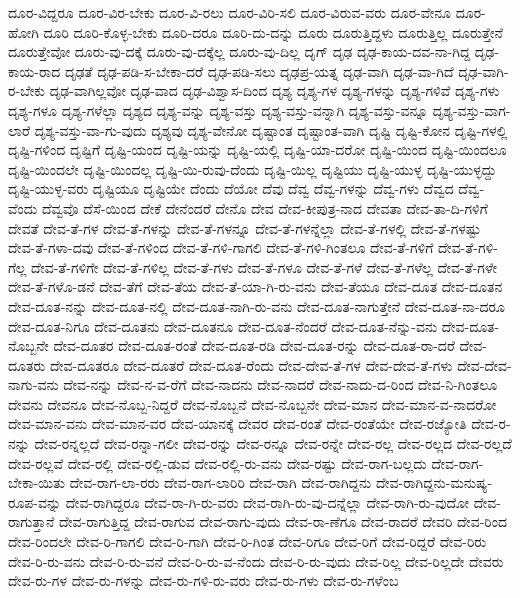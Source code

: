 {ದೂರ-ವಿದ್ದರೂ
ದೂರ-ವಿರ-ಬೇಕು
ದೂರ-ವಿ-ರಲು
ದೂರ-ವಿರಿ-ಸಲಿ
ದೂರ-ವಿರುವ-ವರು
ದೂರ-ವೇನೂ
ದೂರ-ಹೋಗಿ
ದೂರಿ
ದೂರಿ-ಕೊಳ್ಳ-ಬೇಕು
ದೂರಿ-ದರೂ
ದೂರಿ-ದು-ದನ್ನು
ದೂರು
ದೂರುತ್ತಿದ್ದಳು
ದೂರುತ್ತಿಲ್ಲ
ದೂರುತ್ತೇನೆ
ದೂರುತ್ತೇವೋ
ದೂರು-ವು-ದಕ್ಕೆ
ದೂರು-ವು-ದಕ್ಕೆಲ್ಲ
ದೂರು-ವು-ದಿಲ್ಲ
ದೃಗ್
ದೃಢ
ದೃಢ-ಕಾಯ-ದವ-ನಾ-ಗಿದ್ದ
ದೃಢ-ಕಾಯ-ರಾದ
ದೃಢತೆ
ದೃಢ-ಪಡಿ-ಸ-ಬೇಕಾ-ದರೆ
ದೃಢ-ಪಡಿ-ಸಲು
ದೃಢಪ್ರ-ಯತ್ನ
ದೃಢ-ವಾಗಿ
ದೃಢ-ವಾ-ಗಿದೆ
ದೃಢ-ವಾಗಿ-ರ-ಬೇಕು
ದೃಢ-ವಾಗಿಲ್ಲವೋ
ದೃಢ-ವಾದ
ದೃಢ-ವಿಶ್ವಾಸ-ದಿಂದ
ದೃಶ್ಯ
ದೃಶ್ಯ-ಗಳ
ದೃಶ್ಯ-ಗಳನ್ನು
ದೃಶ್ಯ-ಗಳಿವೆ
ದೃಶ್ಯ-ಗಳು
ದೃಶ್ಯ-ಗಳೂ
ದೃಶ್ಯ-ಗಳೆಲ್ಲಾ
ದೃಶ್ಯದ
ದೃಶ್ಯ-ವನ್ನು
ದೃಶ್ಯ-ವಸ್ತು
ದೃಶ್ಯ-ವಸ್ತು-ವನ್ನಾಗಿ
ದೃಶ್ಯ-ವಸ್ತು-ವನ್ನೂ
ದೃಶ್ಯ-ವಸ್ತು-ವಾಗ-ಲಾರೆ
ದೃಶ್ಯ-ವಸ್ತು-ವಾ-ಗು-ವುದು
ದೃಶ್ಯವು
ದೃಶ್ಯ-ವೇನೋ
ದೃಷ್ಟಾಂತ
ದೃಷ್ಟಾಂತ-ವಾಗಿ
ದೃಷ್ಟಿ
ದೃಷ್ಟಿ-ಕೋನ
ದೃಷ್ಟಿ-ಗಳಲ್ಲಿ
ದೃಷ್ಟಿ-ಗಳಿಂದ
ದೃಷ್ಟಿಗೆ
ದೃಷ್ಟಿ-ಯಂದ
ದೃಷ್ಟಿ-ಯನ್ನು
ದೃಷ್ಟಿ-ಯಲ್ಲಿ
ದೃಷ್ಟಿ-ಯಾ-ದರೋ
ದೃಷ್ಟಿ-ಯಿಂದ
ದೃಷ್ಟಿ-ಯಿಂದಲೂ
ದೃಷ್ಟಿ-ಯಿಂದಲೇ
ದೃಷ್ಟಿ-ಯಿಂದಲ್ಲ
ದೃಷ್ಟಿ-ಯಿ-ರುವು-ದೆಂದು
ದೃಷ್ಟಿ-ಯಿಲ್ಲ
ದೃಷ್ಟಿಯು
ದೃಷ್ಟಿ-ಯುಳ್ಳ
ದೃಷ್ಟಿ-ಯುಳ್ಳದ್ದು
ದೃಷ್ಟಿ-ಯುಳ್ಳ-ವರು
ದೃಷ್ಟಿಯೂ
ದೃಷ್ಟಿಯೇ
ದೆಂದು
ದೆಯೋ
ದೆವು
ದೆವ್ವ
ದೆವ್ವ-ಗಳನ್ನು
ದೆವ್ವ-ಗಳು
ದೆವ್ವದ
ದೆವ್ವ-ವೆಂದು
ದೆವ್ವವೊ
ದೆಸೆ-ಯಿಂದ
ದೇಕೆ
ದೇನೆಂದರೆ
ದೇನೊ
ದೇವ
ದೇವ-ಕೀಪುತ್ರ-ನಾದ
ದೇವತಾ
ದೇವ-ತಾ-ದಿ-ಗಳಿಗೆ
ದೇವತೆ
ದೇವ-ತೆ-ಗಳ
ದೇವ-ತೆ-ಗಳನ್ನು
ದೇವ-ತೆ-ಗಳನ್ನೂ
ದೇವ-ತೆ-ಗಳನ್ನೆಲ್ಲಾ
ದೇವ-ತೆ-ಗಳಲ್ಲಿ
ದೇವ-ತೆ-ಗಳಷ್ಟು
ದೇವ-ತೆ-ಗಳಾ-ದವು
ದೇವ-ತೆ-ಗಳಿಂದ
ದೇವ-ತೆ-ಗಳಿ-ಗಾಗಲಿ
ದೇವ-ತೆ-ಗಳಿ-ಗಿಂತಲೂ
ದೇವ-ತೆ-ಗಳಿಗೆ
ದೇವ-ತೆ-ಗಳಿ-ಗೆಲ್ಲ
ದೇವ-ತೆ-ಗಳಿಗೇ
ದೇವ-ತೆ-ಗಳಿಲ್ಲ
ದೇವ-ತೆ-ಗಳು
ದೇವ-ತೆ-ಗಳೂ
ದೇವ-ತೆ-ಗಳೆ
ದೇವ-ತೆ-ಗಳೆಲ್ಲ
ದೇವ-ತೆ-ಗಳೇ
ದೇವ-ತೆ-ಗಳೊ-ಡನೆ
ದೇವ-ತೆಗೆ
ದೇವ-ತೆಯ
ದೇವ-ತೆ-ಯಾ-ಗಿ-ರು-ವನು
ದೇವ-ತೆಯೂ
ದೇವ-ದೂತ
ದೇವ-ದೂತನ
ದೇವ-ದೂತ-ನನ್ನು
ದೇವ-ದೂತ-ನಲ್ಲಿ
ದೇವ-ದೂತ-ನಾಗಿ-ರು-ವನು
ದೇವ-ದೂತ-ನಾಗುತ್ತೇನೆ
ದೇವ-ದೂತ-ನಾ-ದರೂ
ದೇವ-ದೂತ-ನಿಗೂ
ದೇವ-ದೂತನು
ದೇವ-ದೂತನೂ
ದೇವ-ದೂತ-ನೆಂದರೆ
ದೇವ-ದೂತ-ನೆನ್ನು-ವನು
ದೇವ-ದೂತ-ನೊಬ್ಬನೇ
ದೇವ-ದೂತರ
ದೇವ-ದೂತ-ರಂತೆ
ದೇವ-ದೂತ-ರಡಿ
ದೇವ-ದೂತ-ರನ್ನು
ದೇವ-ದೂತ-ರಾ-ದರೆ
ದೇವ-ದೂತರು
ದೇವ-ದೂತರೂ
ದೇವ-ದೂತರೆ
ದೇವ-ದೂತ-ರೆಂದು
ದೇವ-ದೇವ-ತೆ-ಗಳ
ದೇವ-ದೇವ-ತೆ-ಗಳು
ದೇವ-ದೇವ-ನಾಗು-ವನು
ದೇವ-ನನ್ನು
ದೇವ-ನ-ವ-ರೆಗೆ
ದೇವ-ನಾದನು
ದೇವ-ನಾದರೆ
ದೇವ-ನಾದು-ದ-ರಿಂದ
ದೇವ-ನಿ-ಗಿಂತಲೂ
ದೇವನು
ದೇವನೂ
ದೇವ-ನೊಬ್ಬ-ನಿದ್ದರೆ
ದೇವ-ನೊಬ್ಬನೆ
ದೇವ-ನೊಬ್ಬನೇ
ದೇವ-ಮಾನ
ದೇವ-ಮಾನ-ವ-ನಾದರೋ
ದೇವ-ಮಾನ-ವನು
ದೇವ-ಮಾನ-ವರ
ದೇವ-ಯಾನಕ್ಕೆ
ದೇವರ
ದೇವ-ರಂತೆ
ದೇವ-ರಂತೆಯೇ
ದೇವ-ರಜ್ಯೋತಿ
ದೇವ-ರ-ನನ್ನು
ದೇವ-ರನ್ನಲ್ಲದೆ
ದೇವ-ರನ್ನಾ-ಗಲೀ
ದೇವ-ರನ್ನು
ದೇವ-ರನ್ನೂ
ದೇವ-ರನ್ನೇ
ದೇವ-ರಲ್ಲ
ದೇವ-ರಲ್ಲದ
ದೇವ-ರಲ್ಲದೆ
ದೇವ-ರಲ್ಲವೆ
ದೇವ-ರಲ್ಲಿ
ದೇವ-ರಲ್ಲಿ-ಡುವ
ದೇವ-ರಲ್ಲಿ-ರು-ವನು
ದೇವ-ರಷ್ಟು
ದೇವ-ರಾಗ-ಬಲ್ಲದು
ದೇವ-ರಾಗ-ಬೇಕಾ-ಯಿತು
ದೇವ-ರಾಗ-ಲಾ-ರರು
ದೇವ-ರಾಗ-ಲಾರಿರಿ
ದೇವ-ರಾಗಿ
ದೇವ-ರಾಗಿದ್ದನು
ದೇವ-ರಾಗಿದ್ದನು-ಮನುಷ್ಯ-ರೂಪ-ವನ್ನು
ದೇವ-ರಾಗಿದ್ದರೂ
ದೇವ-ರಾ-ಗಿ-ರು-ವರು
ದೇವ-ರಾಗಿ-ರು-ವು-ದನ್ನೆಲ್ಲಾ
ದೇವ-ರಾಗಿ-ರು-ವುದೋ
ದೇವ-ರಾಗುತ್ತಾನೆ
ದೇವ-ರಾಗುತ್ತಿದ್ದ
ದೇವ-ರಾಗುವ
ದೇವ-ರಾಗು-ವುದು
ದೇವ-ರಾ-ಣೆಗೂ
ದೇವ-ರಾದರೆ
ದೇವರಿ
ದೇವ-ರಿಂದ
ದೇವ-ರಿಂದಲೇ
ದೇವ-ರಿ-ಗಾಗಲಿ
ದೇವ-ರಿ-ಗಾಗಿ
ದೇವ-ರಿ-ಗಿಂತ
ದೇವ-ರಿಗೂ
ದೇವ-ರಿಗೆ
ದೇವ-ರಿದ್ದರೆ
ದೇವ-ರಿರು
ದೇವ-ರಿ-ರು-ವನು
ದೇವ-ರಿ-ರು-ವನೆ
ದೇವ-ರಿ-ರು-ವ-ನೆಂದು
ದೇವ-ರಿ-ರು-ವುದು
ದೇವ-ರಿಲ್ಲ
ದೇವ-ರಿಲ್ಲದೇ
ದೇವರು
ದೇವ-ರು-ಗಳ
ದೇವ-ರು-ಗಳನ್ನು
ದೇವ-ರು-ಗಳಿ-ರು-ವರು
ದೇವ-ರು-ಗಳು
ದೇವ-ರು-ಗಳೆಂಬ
}
